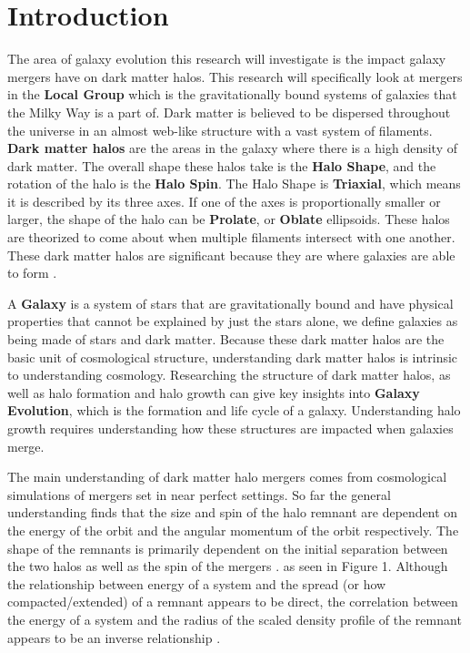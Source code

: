 \documentclass[linenumbers,trackchanges]{aastex7}
\begin{document}
\section{Introduction} 

The area of galaxy evolution this research will investigate is the impact galaxy mergers have on dark matter halos. This research will specifically look at mergers in the \textbf{Local Group} which is the gravitationally bound systems of galaxies that the Milky Way is a part of. Dark matter is believed to be dispersed throughout the universe in an almost web-like structure with a vast system of filaments. \textbf{Dark matter halos} are the areas in the galaxy where there is a high density of dark matter. The overall shape these halos take is the \textbf{Halo Shape}, and the rotation of the halo is the \textbf{Halo Spin}. The Halo Shape is \textbf{Triaxial}, which means it is described by its three axes. If one of the axes is proportionally smaller or larger, the shape of the halo can be \textbf{Prolate}, or \textbf{Oblate} ellipsoids. These halos are theorized to come about when multiple filaments intersect with one another. These dark matter halos are significant because they are where galaxies are able to form \cite{Frenk_2012}. 

A \textbf{Galaxy} is a system of stars that are gravitationally bound and have physical properties that cannot be explained by just the stars alone, we define galaxies as being made of stars and dark matter. Because these dark matter halos are the basic unit of cosmological structure, understanding dark matter halos is intrinsic to understanding cosmology. Researching the structure of dark matter halos, as well as halo formation and halo growth can give key insights into \textbf{Galaxy Evolution}, which is the formation and life cycle of a galaxy. Understanding halo growth requires understanding how these structures are impacted when galaxies merge. 

The main understanding of dark matter halo mergers comes from cosmological simulations of mergers set in near perfect settings. So far the general understanding finds that the size  and spin of the halo remnant are dependent on the energy of the orbit and the angular momentum of the orbit respectively. The shape of the remnants is primarily dependent on the initial separation between the two halos as well as the spin of the mergers \cite{2019MNRAS.487..993D}. as seen in Figure 1. Although the relationship between energy of a system and the spread (or how compacted/extended) of a remnant appears to be direct, the correlation between the energy of a system and the radius of the scaled density profile of the remnant appears to be an inverse relationship \cite{2019MNRAS.487.1008D}.
\end{document}
